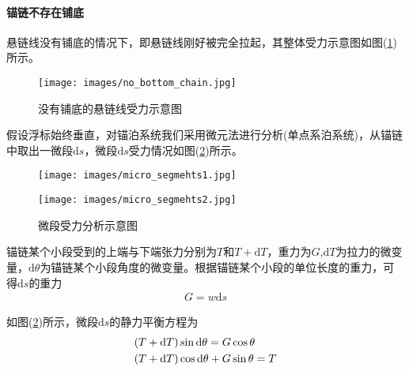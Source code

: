             \paragraph{锚链不存在铺底}悬链线没有铺底的情况下，即悬链线刚好被完全拉起，其整体受力示意图如图(\ref{fig:没有铺底的悬链线受力示意图})所示。
            \begin{figure}[H]
            \centering
            \texttt{[image: images/no\_bottom\_chain.jpg]}
            \caption{没有铺底的悬链线受力示意图}
            \label{fig:没有铺底的悬链线受力示意图}
            \end{figure}
            \par
            假设浮标始终垂直，对锚泊系统我们采用微元法进行分析(单点系泊系统)，从锚链中取出一微段$\mathrm{d}s$，微段$\mathrm{d}s$受力情况如图(\ref{fig:微段受力分析示意图})所示。
            \begin{figure}[H]
              \centering
              \begin{varwidth}[t]{\textwidth}
                \vspace{0pt}
                \texttt{[image: images/micro\_segmehts1.jpg]}
              \end{varwidth}
              \qquad
              \begin{varwidth}[t]{\textwidth}
                \vspace{0pt}
                \texttt{[image: images/micro\_segmehts2.jpg]}
              \end{varwidth}
            \caption{微段受力分析示意图}
            \label{fig:微段受力分析示意图}
            \end{figure}
            \par
            锚链某个小段受到的上端与下端张力分别为$T$和$T+\mathrm{d}T$，重力为$G$,$\mathrm{d}T$为拉力的微变量，$\mathrm{d}\theta$为锚链某个小段角度的微变量。根据锚链某个小段的单位长度的重力，可得$\mathrm{d}s$的重力
            \begin{align*}
            G = w\mathrm{d}s
            \end{align*}
            \par
            如图(\ref{fig:微段受力分析示意图})所示，微段$\mathrm{d}s$的静力平衡方程为
            \begin{align}
            \label{微段静力平衡方程}
            & (T+\mathrm{d}T)\sin \mathrm{d}\theta = G\cos\theta\\
            & (T+\mathrm{d}T) \cos \mathrm{d}\theta+G\sin \theta = T\notag
            \end{align}
